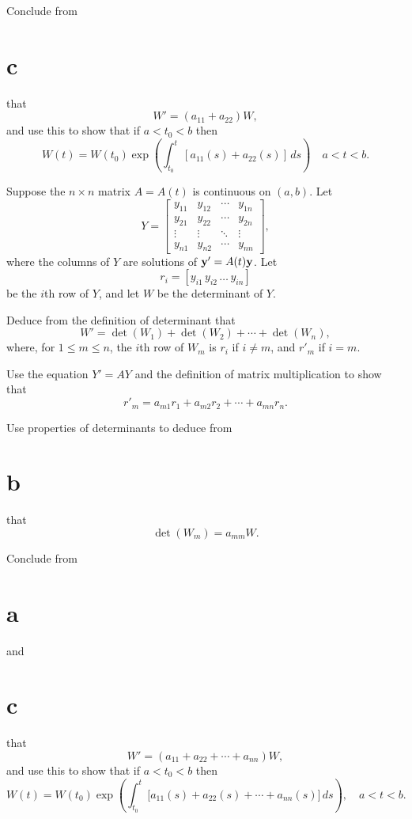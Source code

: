 \begin{exerciselist}
\begin{alist}
    \item %
    Conclude from \part{c} that
    \[
      W'=(a_{11}+a_{22})W,
    \]
    and use this to show that if $a<t_{0}<b$ then
    \[
      W(t)=W(t_{0})\exp\left(\int^{t}_{t_{0}}\left[a_{11}(s)+a_{22}(s) \right]\,ds\right)\quad a<t<b.
    \]
  \end{alist}

  \item\label{exer:10.3.5} Suppose the $n\times n$ matrix $A=A(t)$ is continuous on $(a,b)$. Let
  \[
    Y= \left[
    \begin{array}{cccc}
      y_{11} & y_{12} & \cdots & y_{1n} \\
      y_{21} & y_{22} & \cdots & y_{2n} \\
      \vdots & \vdots & \ddots & \vdots \\
      y_{n1} & y_{n2} & \cdots & y_{nn}
    \end{array}\right],
  \]
  where the columns of $Y$ are solutions of ${\bf y}'=A(t){\bf y}$. Let
  \[
    r_{i}=[y_{i1}\,y_{i2}\,\dots\,y_{in}]
  \]
  be the $i$th row of $Y$, and let $W$ be the determinant of $Y$.

  \begin{alist}
    \item %
    Deduce from the definition of determinant that
    \[
      W'=\det(W_{1})+\det(W_{2})+\cdots+\det(W_{n}),
    \]
    where, for $1\le m\le n$, the $i$th row of $W_{m}$ is $r_{i}$ if $i\ne m$, and $r'_{m}$ if
    $i=m$.

    \item %
    Use the equation $Y'=AY$ and the definition of matrix multiplication to show that
    \[
      r'_{m}=a_{m1}r_{1}+a_{m2}r_{2}+\cdots+a_{mn}r_{n}.
    \]

    \item %
    Use properties of determinants to deduce from \part{b} that
    \[
      \det(W_{m})=a_{mm}W.
    \]

    \item %
    Conclude from \part{a} and \part{c} that
    \[
      W'=(a_{11}+a_{22}+\cdots+a_{nn})W,
    \]
    and use this to show that if $a<t_{0}<b$ then
    \[
      W(t)=W(t_{0})\exp\left( \int^{t}_{t_{0}}\big[a_{11}(s)+a_{22}(s)+\cdots+a_{nn}(s)]\, ds\right),\quad a<t<b.
    \]
  \end{alist}


\end{exerciselist}
